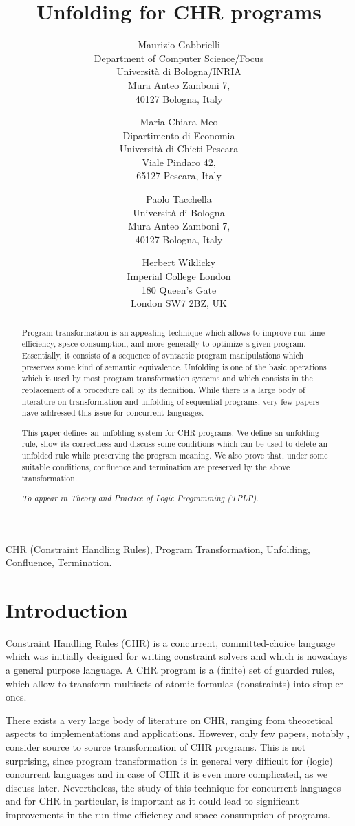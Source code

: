 \documentclass{tlp}
\title[Unfolding for CHR programs]
      {Unfolding for CHR programs}
\author[M. Gabbrielli, M.C. Meo, P. Tacchella and H. Wiklicky]{
	Maurizio Gabbrielli\\
		Department of Computer Science/Focus \\
		Universit\`a di Bologna/INRIA\\
		Mura Anteo Zamboni 7,\\
		40127 Bologna, Italy\\
		\email{gabbri@cs.unibo.it}
\and
        Maria Chiara Meo\\
		Dipartimento di Economia\\
		Universit\`a di Chieti-Pescara\\
		Viale Pindaro 42,\\
		65127 Pescara, Italy\\
		\email{cmeo@unich.it}
\and
        Paolo Tacchella\\
		Universit\`a di Bologna\\
		Mura Anteo Zamboni 7,\\
		40127 Bologna, Italy\\
		\email{Paolo.Tacchella@cs.unibo.it}
		\and
        	Herbert Wiklicky\\
		Imperial College London\\
		180 Queen's Gate\\
		London SW7 2BZ, UK\\
		\email{herbert@doc.ic.ac.uk}
}
\begin{document}


\maketitle


\begin{abstract}
Program transformation is an appealing technique which allows to
improve  run-time efficiency, space-consumption, and more generally
to optimize a given program. Essentially, it consists of a sequence
of syntactic program manipulations which preserves some kind of
semantic equivalence. Unfolding is one of the basic operations which is used
by most program transformation systems and which
consists in the replacement of a procedure call by its definition.
While there is a large body of literature on transformation and
unfolding of sequential programs, very few papers have addressed
this issue for concurrent languages.

This paper defines an unfolding system
for CHR programs. We define an unfolding rule, show its
correctness and discuss some conditions which can be used to
delete an unfolded rule while preserving the program meaning.
We also prove that, under some suitable conditions, confluence and termination are preserved by the above transformation.

{\em To appear
in Theory and Practice of Logic Programming (TPLP).}

\end{abstract}

\begin{keywords}
CHR (Constraint Handling Rules), Program Transformation, Unfolding, Confluence, Termination.
\end{keywords}
\section{Introduction}

Constraint  Handling Rules (CHR) \cite{Fru98,FA03,Fru08} is a
concurrent, committed-choice language which was initially designed for writing
constraint solvers and which is nowadays a general purpose language. A CHR program is a (finite) set of guarded rules, which
allow to transform multisets of atomic formulas (constraints) into simpler ones.


There exists a very  large body of literature on
CHR, ranging from theoretical aspects to implementations and
applications. However,
only few papers, notably  \cite{FH03,Fru04,SSD05b,TMG07,Tac08,SS09}, consider  source to source transformation of CHR programs. This is not surprising,
since program transformation is in general very difficult for
(logic) concurrent languages and in case of CHR it is even more
complicated, as we discuss later.  Nevertheless, the study of this technique
for concurrent languages and for CHR in particular, is important
as it could lead to significant improvements in the run-time efficiency and space-consumption of programs.
\end{document}
